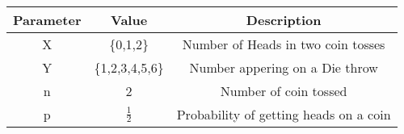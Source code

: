 \begin{center}
	\begin{tabular}{|c|c|c|} 
		\hline
		Parameter & Value & Description \\
		\hline
		X & \{0,1,2\} & Number of Heads in two coin tosses \\
		\hline
		Y & \{1,2,3,4,5,6\} & Number appering on a Die throw\\
		\hline
		n & 2 & Number of coin tossed\\
		\hline
		p & $\frac{1}{2}$ & Probability of getting heads on a coin \\
		\hline
	\end{tabular}
\end{center}